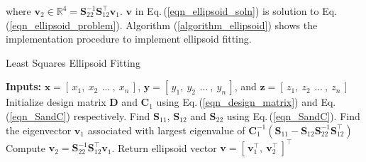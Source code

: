 \documentclass[10pt, a4paper]{article}
\begin{document}
where $\bm{v}_{2} \in \mathbb{R}^{4}  = \bm{S}_{22}^{-1}\bm{S}_{12}^{\intercal}\bm{v}_{1}$. $\bm{v}$ in Eq.\,(\ref{eqn_ellipsoid_soln}) is solution to Eq.\,(\ref{eqn_ellipsoid_problem}). Algorithm (\ref{algorithm_ellipsoid}) shows the implementation procedure to implement ellipsoid fitting.

\begin{algorithm} 
\label{algorithm_ellipsoid}
\caption{Least Squares Ellipsoid Fitting}
\begin{algorithmic}[1]
\State \textbf{Inputs:}
\Statex \quad $\bm{x} = [\,x_{1},\:x_{2}\,\:...\:,\: x_{n}\,]$, $\bm{y} = [\,y_{1},\:y_{2}\,\:...\:,\: y_{n} \,]$, and $\bm{z} = [\,z_{1},\:z_{2}\,\:...\:,\: z_{n} \,]$
    \State Initialize design matrix $\bm{D}$ and $\bm{C}_{1}$ using Eq.\,(\ref{eqn_design_matrix}) and Eq.\,(\ref{eqn_SandC}) respectively. 
    \State Find $\bm{S}_{11}$, $\bm{S}_{12}$ and $\bm{S}_{22}$ using Eq.\,(\ref{eqn_SandC}).
    \State Find the eigenvector $\bm{v}_{1}$ associated with largest eigenvalue of $\bm{C}_{1}^{-1}(\bm{S}_{11}-\bm{S}_{12}\bm{S}_{22}^{-1}\bm{S}_{12}^{\intercal})$
    \State Compute $\bm{v}_{2} = \bm{S}_{22}^{-1}\bm{S}_{12}^{\intercal}\bm{v}_{1}$.
    \State Return ellipsoid vector $\bm{v} = [\,\bm{v}_{1}^{\intercal}, \: \bm{v}_{2}^{\intercal}\,]^{\intercal}$
\end{algorithmic}
\end{algorithm}

\end{document}

